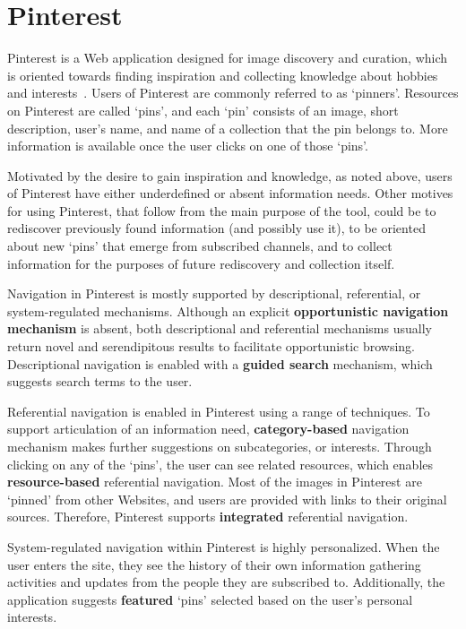 {\section{Pinterest}
Pinterest is a Web application designed for image discovery and curation, which is oriented towards finding inspiration and collecting knowledge about hobbies and interests~\cite{gilbert2013need,zarro2012pinterest,ottoni2013ladies}.  Users of Pinterest are commonly referred to as `pinners'. Resources on Pinterest are called `pins', and each `pin' consists of an image, short description, user's name, and name of a collection that the pin belongs to. More information is available once the user clicks on one of those `pins'.

Motivated by the desire to gain inspiration and knowledge, as noted above, users of Pinterest have either underdefined or absent information needs. Other motives for using Pinterest, that follow from the main purpose of the tool, could be to rediscover previously found information (and possibly use it), to be oriented about new `pins' that emerge from subscribed channels, and to collect information for the purposes of future rediscovery and collection itself.

Navigation in Pinterest is mostly supported by descriptional, referential, or system-regulated mechanisms. Although an explicit \textbf{opportunistic navigation mechanism} is absent, both descriptional and referential mechanisms usually return novel and serendipitous results to facilitate opportunistic browsing. Descriptional navigation is enabled with a \textbf{guided search} mechanism, which suggests search terms to the user. 

Referential navigation is enabled in Pinterest using a range of techniques. To support articulation of an information need, \textbf{category-based} navigation mechanism makes further suggestions on subcategories, or interests. Through clicking on any of the `pins', the user can see related resources, which enables \textbf{resource-based} referential navigation. Most of the images in Pinterest are `pinned' from other Websites, and users are provided with links to their original sources. Therefore, Pinterest supports \textbf{integrated} referential navigation.

System-regulated navigation within Pinterest is highly personalized. When the user enters the site, they see the history of their own information gathering activities and updates from the people they are subscribed to. Additionally, the application suggests \textbf{featured} `pins' selected based on the user's personal interests.

}
